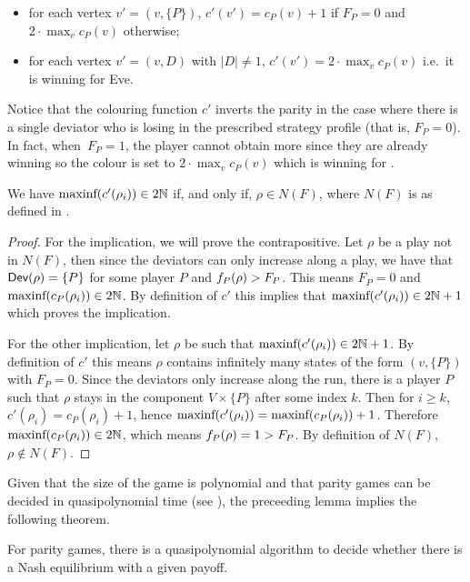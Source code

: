 \begin{itemize}
\item
  for each vertex \(v' = (v, \{ P \})\), \(c'(v') = c_P(v) + 1\) if
  \(F_P = 0\) and \(2 \cdot \max_v c_P(v) \) otherwise;
\item
  for each vertex \(v' = (v, D)\) with \(|D| \ne 1\), \(c'(v') = 2 \cdot \max_v c_P(v)\)
  i.e.~it is winning for Eve.
\end{itemize}

Notice that the colouring function $c'$ inverts the parity
in the case where there is a single deviator who is losing in the
prescribed strategy profile (that is, $F_P=0$). In fact,
when~$F_P=1$, the player cannot obtain more since they are already winning
so the colour is set to $2\cdot \max_v c_P(v) $ which is winning for \Eve.

\begin{lemma}
  We have \(\text{\rm maxinf}(c'(\rho_i)) \in 2 \mathbb{N}\) if, and
  only if, \(\rho\in N(F)\),
  where $N(F)$ is as defined in .
\end{lemma}
\begin{proof} For the implication, we will prove the contrapositive.
Let \(\rho\) be a play not in \(N(F)\), then since the deviators can only
increase along a play, we have that \(\textsf{Dev}(\rho) = \{ P \}\) for some
player \(P\) and \(f_P(\rho) > F_P\). This means
\(F_P = 0\) and \(\text{\rm maxinf}(c_P(\rho_i)) \in 2 \mathbb{N}\). By
definition of \(c'\) this implies that
\(\text{\rm maxinf}(c'(\rho_i)) \in 2 \mathbb{N} + 1\) which proves the
implication.

For the other implication, let \(\rho\) be such that
\(\text{\rm maxinf}(c'(\rho_i)) \in 2 \mathbb{N} + 1\). By definition of
\(c'\) this means \(\rho\) contains infinitely many states of the form
\((v, \{P\})\) with \(F_P = 0\). Since the deviators only increase
along the run, there is a player \(P\) such that \(\rho\) stays in the
component \(V \times \{P\}\) after some index \(k\). Then for \(i\geq k\),
\(c'(\rho_i) = c_P(\rho_i)+1\), hence
\(\text{\rm maxinf}(c'(\rho_i)) = \text{\rm maxinf}(c_P(\rho_i)) + 1\).
Therefore \(\text{\rm maxinf}(c_P(\rho_i)) \in 2 \mathbb{N}\), which means
\(f_P(\rho) = 1 > F_P\). By definition of \(N(F)\),
\(\rho\not\in N(F)\).
\end{proof}

Given that the size of the game is polynomial and that parity games can
be decided in quasipolynomial time (see ), the preceeding lemma
implies the following theorem.

\begin{theorem}
For parity games, there is a quasipolynomial algorithm to decide whether there is a Nash
equilibrium with a given payoff.
\end{theorem}

